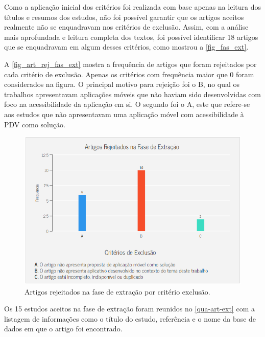 Como a aplicação inicial dos critérios foi realizada com base apenas na leitura dos títulos e resumos dos estudos, não foi possível garantir que os artigos aceitos realmente não se enquadravam nos critérios de exclusão.
Assim, com a análise mais aprofundada e leitura completa dos textos, foi possível identificar 18 artigos que se enquadravam em algum desses critérios, como mostrou a \autoref{fig_fas_ext}.

\newpage

A \autoref{fig_art_rej_fas_ext} mostra a frequência de artigos que foram rejeitados por cada critério de exclusão.
Apenas os critérios com frequência maior que 0 foram considerados na figura.
O principal motivo para rejeição foi o B, no qual os trabalhos apresentavam aplicações móveis que não haviam sido desenvolvidas com foco na acessibilidade da aplicação em si.
O segundo foi o A, este que refere-se aos estudos que não apresentavam uma aplicação móvel com acessibilidade à PDV como solução.

\begin{figure}[htb]
  \caption{\label{fig_art_rej_fas_ext}Artigos rejeitados na fase de extração por critério exclusão.}
  \begin{center}
    \includegraphics[scale=0.8]{Imagens/msl/artigos_rejeitados_fase_extracao.png}
  \end{center}
\end{figure}

Os 15 estudos aceitos na fase de extração foram reunidos no \autoref{qua-art-ext} com a listagem de informações como o título
do estudo, referência e o nome da base de dados em que o artigo foi encontrado.

